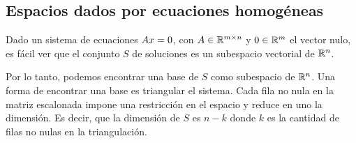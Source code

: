 %
%
%

\subsection{Espacios dados por ecuaciones homog\'eneas}

Dado un sistema de ecuaciones $\Ab \xb = \cero$, con $\Ab \in \R^{m \times n}$ y $\cero \in \R^m$ el vector nulo, es fácil ver que el conjunto $S$ de soluciones es un subespacio vectorial de $\mathbb R^n$.

Por lo tanto, podemos encontrar una base de $S$ como subespacio de $\mathbb R^n$. Una forma de encontrar una base es triangular el sistema. Cada fila no nula en la matriz escalonada impone una restricción en el espacio y reduce en uno la dimensión. Es decir, que la dimensión de $S$ es $n - k$ donde $k$ es la cantidad de filas no nulas en la triangulación.

